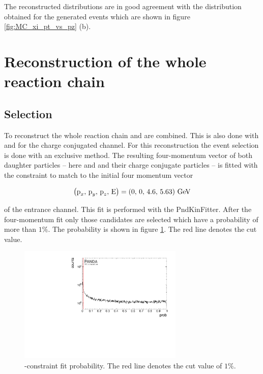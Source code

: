 	The reconstructed distributions are in good agreement with the distribution obtained for the generated events which are 
	shown in figure \ref{fig:MC_xi_pt_vs_pz} (b).
	
	
	
\newpage
\section{Reconstruction of the whole reaction chain}

	\subsection*{Selection}
	
	To reconstruct the whole reaction chain \excitedcascade and \anticascade are combined.
	This is also done with \excitedanticascade and \cascade for the charge conjugated channel.
	For this reconstruction the event selection is done with an exclusive method.
	The resulting four-momentum vector of both daughter particles --  here \excitedcascade 
	and \anticascade and their charge conjugate particles -- is fitted with the constraint to match to the initial four momentum vector  

	\begin{center}
		\begin{equation}\nonumber
			\left(\textnormal{p}_x,\, \textnormal{p}_y,\, \textnormal{p}_z,\, \textnormal{E} \right) = \left(0,\, 0,\, 4.6,\, 5.63 \right) \, \textnormal{GeV}
		\end{equation}
	\end{center}
	of the \pbarp entrance channel.	
	This fit is performed with the PndKinFitter.
	After the four-momentum fit only those candidates are selected which have a probability of more than $1\%$.
	The probability is shown in figure \ref{fig:xisys_prob}. 
	The red line denotes the cut value.

	\begin{figure}
		\centering
		\includegraphics[width=0.7\textwidth]{./plots/pbarp/XiSys_prob.pdf}
		\caption{-constraint fit probability. The red line denotes the cut value of $1\%$.}
		\label{fig:xisys_prob}
	\end{figure}
	
